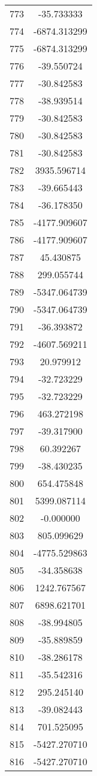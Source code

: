 \documentclass[12pt]{article}
\begin{document}
\begin{longtable}{@{}cc@{}}
773 & -35.733333 \\
774 & -6874.313299 \\
775 & -6874.313299 \\
776 & -39.550724 \\
777 & -30.842583 \\
778 & -38.939514 \\
779 & -30.842583 \\
780 & -30.842583 \\
781 & -30.842583 \\
782 & 3935.596714 \\
783 & -39.665443 \\
784 & -36.178350 \\
785 & -4177.909607 \\
786 & -4177.909607 \\
787 & 45.430875 \\
788 & 299.055744 \\
789 & -5347.064739 \\
790 & -5347.064739 \\
791 & -36.393872 \\
792 & -4607.569211 \\
793 & 20.979912 \\
794 & -32.723229 \\
795 & -32.723229 \\
796 & 463.272198 \\
797 & -39.317900 \\
798 & 60.392267 \\
799 & -38.430235 \\
800 & 654.475848 \\
801 & 5399.087114 \\
802 & -0.000000 \\
803 & 805.099629 \\
804 & -4775.529863 \\
805 & -34.358638 \\
806 & 1242.767567 \\
807 & 6898.621701 \\
808 & -38.994805 \\
809 & -35.889859 \\
810 & -38.286178 \\
811 & -35.542316 \\
812 & 295.245140 \\
813 & -39.082443 \\
814 & 701.525095 \\
815 & -5427.270710 \\
816 & -5427.270710 \\

\end{longtable}
\end{document}

